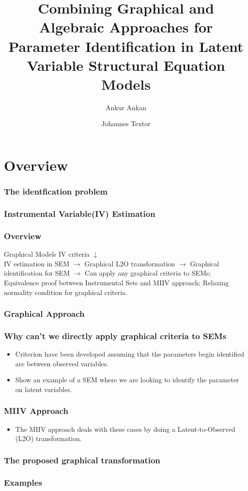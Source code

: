 \documentclass{beamer}
\begin{document}
\title[Combining Graphical and Algebraic Approaches for Parameter Identification in Latent Variable SEM]{Combining Graphical and Algebraic Approaches for Parameter Identification in Latent Variable Structural Equation Models}
\author {Ankur Ankan \and Johannes Textor}
\date{}
\maketitle

\section{Overview}
\begin{frame}
	\frametitle{The identfication problem}
\end{frame}

\begin{frame}
	\frametitle{Instrumental Variable(IV) Estimation}
\end{frame}

\begin{frame}
	\frametitle{Overview}
	Graphical Models IV criteria $\downarrow $ \\
	IV estimation in SEM $ \rightarrow $ Graphical L2O transformation $ \rightarrow $ Graphical identification for SEM $ \rightarrow $ Can apply any graphical criteria to SEMs; Equivalence proof between Instrumental Sets and MIIV approach; Relaxing normality condition for graphical criteria.
\end{frame}

\begin{frame}
	\frametitle{Graphical Approach}
\end{frame}

\begin{frame}
	\frametitle{Why can't we directly apply graphical criteria to SEMs}
	\begin{itemize}
		\item Criterion have been developed assuming that the parameters 
			begin identified are between observed variables.
		\item Show an example of a SEM where we are looking to identify 
			the parameter on latent variables.
	\end{itemize}
\end{frame}

\begin{frame}
	\frametitle{MIIV Approach}
	\begin{itemize}
		\item The MIIV approach deals with these cases by doing a
			Latent-to-Observed (L2O) transformation.
	\end{itemize}
\end{frame}

\begin{frame}
	\frametitle{The proposed graphical transformation}
\end{frame}

\begin{frame}
	\frametitle{Examples}
\end{frame}
\end{document}

